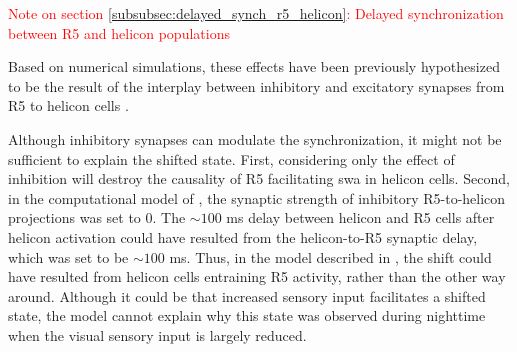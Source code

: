 \documentclass[../main.tex]{subfiles}
\begin{document}




\newpage

\textcolor{red}{Note on section \ref{subsubsec:delayed_synch_r5_helicon}: Delayed synchronization between R5 and helicon populations}

Based on numerical simulations, these effects have been previously hypothesized to be the result of the interplay between inhibitory and excitatory synapses from R5 to helicon cells \cite{krummSlowlyOscillatingBrain2021}.

Although inhibitory synapses can modulate the synchronization, it might not be sufficient to explain the shifted state. First, considering only the effect of inhibition will destroy the causality of R5 facilitating \gls{swa} in helicon cells. Second, in the computational model of \cite{raccugliaCoherentMultilevelNetwork2022}, the synaptic strength of inhibitory R5-to-helicon projections was set to $0$. The $\sim 100$ ms delay between helicon and R5 cells after helicon activation could have resulted from the helicon-to-R5 synaptic delay, which was set to be $\sim 100$ ms. Thus, in the model described in \cite{raccugliaCoherentMultilevelNetwork2022}, the shift could have resulted from helicon cells entraining R5 activity, rather than the other way around. Although it could be that increased sensory input facilitates a shifted state, the model cannot explain why this state was observed during nighttime when the visual sensory input is largely reduced.
\end{document}
